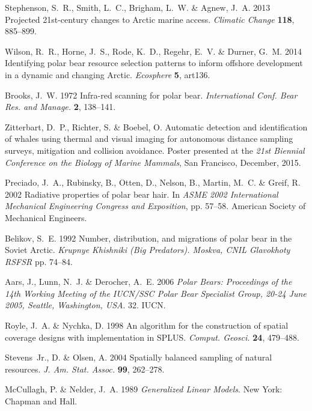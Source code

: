 \documentclass[]{rsos}%
\begin{document}
\begin{thebibliography}{10}
Stephenson, S.~R., Smith, L.~C., Brigham, L.~W. \& Agnew, J.~A. 2013 Projected
  21st-century changes to {A}rctic marine access.
 \emph{Climatic Change} \textbf{118}, 885--899.

Wilson, R.~R., Horne, J.~S., Rode, K.~D., Regehr, E.~V. \& Durner, G.~M. 2014
  Identifying polar bear resource selection patterns to inform offshore
  development in a dynamic and changing {A}rctic.
 \emph{Ecosphere} \textbf{5}, art136.

Brooks, J.~W. 1972 Infra-red scanning for polar bear.
 \emph{International Conf. Bear Res. and Manage.} \textbf{2},
  138--141.

Zitterbart, D.~P., Richter, S. \& Boebel, O. Automatic detection and
  identification of whales using thermal and visual imaging for autonomous
  distance sampling surveys, mitigation and collision avoidance.
  Poster presented at the \emph{21st {B}iennial {C}onference on the
  {B}iology of {M}arine {M}ammals}, San Francisco, December, 2015.

Preciado, J.~A., Rubinsky, B., Otten, D., Nelson, B., Martin, M.~C. \& Greif,
  R. 2002 Radiative properties of polar bear hair.
 In \emph{ASME 2002 International Mechanical Engineering Congress and
  Exposition}, pp. 57--58. American Society of Mechanical Engineers.

Belikov, S.~E. 1992 Number, distribution, and migrations of polar bear in the
  {S}oviet {A}rctic.
 \emph{Krupnye Khishniki (Big Predators). Moskva, CNIL Glavokhoty
  RSFSR} pp. 74--84.

Aars, J., Lunn, N.~J. \& Derocher, A.~E. 2006 \emph{Polar Bears: Proceedings
  of the 14th Working Meeting of the IUCN/SSC Polar Bear Specialist Group,
  20-24 June 2005, Seattle, Washington, USA}.
 32. IUCN.

Royle, J.~A. \& Nychka, D. 1998 An algorithm for the construction of spatial
  coverage designs with implementation in {SPLUS}.
 \emph{Comput. Geosci.} \textbf{24}, 479--488.

Stevens~Jr., D. \& Olsen, A. 2004 Spatially balanced sampling of natural
  resources.
 \emph{J. Am. Stat. Assoc.} \textbf{99}, 262--278.

McCullagh, P. \& Nelder, J.~A. 1989 \emph{Generalized Linear Models}.
 New York: Chapman and Hall.


\end{thebibliography}
\end{document}
